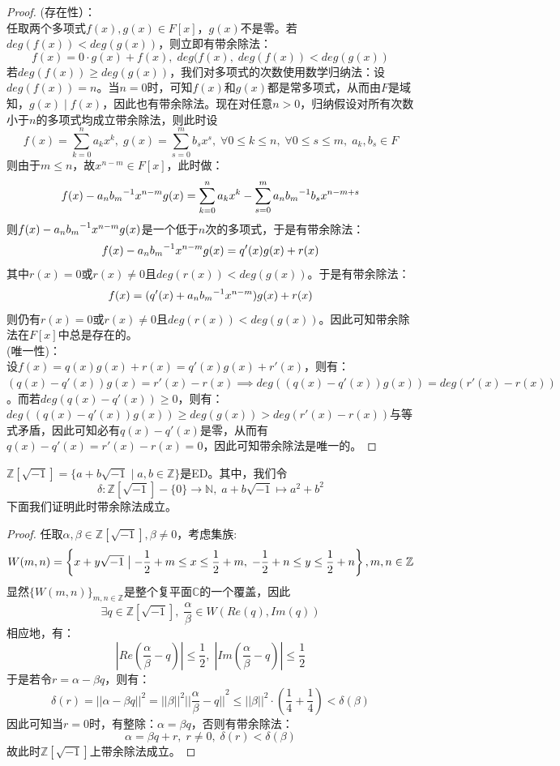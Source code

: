 \begin{proof}
(存在性）：\\
\indent 任取两个多项式$f(x),g(x)\in F[x]$，$g(x)$不是零。若$deg(f(x))<deg(g(x))$，则立即有带余除法：
\[
f(x)=0\cdot g(x)+f(x),\; deg(f(x),\; deg(f(x))<deg(g(x))
\]
\indent 若$deg(f(x))\geq deg(g(x))$，我们对多项式的次数使用数学归纳法：设$deg(f(x))=n$。当$n=0$时，可知$f(x)$和$g(x)$都是常多项式，从而由$F$是域知，$g(x)\mid f(x)$，因此也有带余除法。现在对任意$n>0$，归纳假设对所有次数小于$n$的多项式均成立带余除法，则此时设
\[
f(x)=\sum_{k=0}^{n}a_kx^k,\; g(x)=\sum_{s=0}^{m}b_sx^s,\;\forall 0\leq k\leq n,\;\forall 0\leq s\leq m,\; a_k,b_s\in F
\]
则由于$m\leq n$，故$x^{n-m}\in F[x]$，此时做：
\[
f(x)-a_n{b_m}^{-1}x^{n-m}g(x)=\sum_{k=0}^{n}a_kx^k-\sum_{s=0}^{m}a_n{b_m}^{-1}b_sx^{n-m+s}
\]
则$f(x)-a_n{b_m}^{-1}x^{n-m}g(x)$是一个低于$n$次的多项式，于是有带余除法：
\[
f(x)-a_n{b_m}^{-1}x^{n-m}g(x)=q'(x)g(x)+r(x)
\]
其中$r(x)=0$或$r(x)\neq 0$且$deg(r(x))<deg(g(x))$。于是有带余除法：
\[
f(x)=(q'(x)+a_n{b_m}^{-1}x^{n-m})g(x)+r(x)
\]
则仍有$r(x)=0$或$r(x)\neq 0$且$deg(r(x))<deg(g(x))$。因此可知带余除法在$F[x]$中总是存在的。\\
(唯一性)：\\
\indent 设$f(x)=q(x)g(x)+r(x)=q'(x)g(x)+r'(x)$，则有：$(q(x)-q'(x))g(x)=r'(x)-r(x)\implies deg((q(x)-q'(x))g(x))=deg(r'(x)-r(x))$。而若$deg(q(x)-q'(x))\geq 0$，则有：$deg((q(x)-q'(x))g(x))\geq deg(g(x))>deg(r'(x)-r(x))$与等式矛盾，因此可知必有$q(x)-q'(x)$是零，从而有$q(x)-q'(x)=r'(x)-r(x)=0$，因此可知带余除法是唯一的。
\end{proof}
$\mathbb{Z}[\sqrt{-1}]=\{a+b\sqrt{-1}\mid a,b\in \mathbb{Z}\}$是ED。其中，我们令
\[
\delta\colon \mathbb{Z}[\sqrt{-1}]-\{0\}\to \mathbb{N},\; a+b\sqrt{-1}\mapsto a^2+b^2
\]
下面我们证明此时带余除法成立。
\begin{proof}
任取$\alpha,\beta\in \mathbb{Z}[\sqrt{-1}],\beta\neq 0$，考虑集族:
\[
W(m,n)=\left\{x+y\sqrt{-1}\bigm|-\frac{1}{2}+m\leq x\leq\frac{1}{2}+m,\; -\frac{1}{2}+n\leq y\leq \frac{1}{2}+n\right\}, m,n\in \mathbb{Z}
\]
显然$\{W(m,n)\}_{m,n\in\mathbb{Z}}$是整个复平面$\mathbb{C}$的一个覆盖，因此
\[
\exists q\in \mathbb{Z}[\sqrt{-1}],\; \dfrac{\alpha}{\beta}\in W(Re(q),Im(q))
\]
相应地，有：
\[
|Re(\frac{\alpha}{\beta}-q)|\leq \frac{1}{2},\; |Im(\frac{\alpha}{\beta}-q)|\leq\frac{1}{2}
\]
于是若令$r=\alpha-\beta q$，则有：
\[
\delta(r)={||\alpha-\beta q||}^2={||\beta||}^2{||\frac{\alpha}{\beta}-q||}^2\leq{||\beta||}^2\cdot(\frac{1}{4}+\frac{1}{4})<\delta(\beta)
\]
因此可知当$r=0$时，有整除：$\alpha=\beta q$，否则有带余除法：
\[
\alpha=\beta q+r,\; r\neq 0,\; \delta(r)<\delta(\beta)
\]
故此时$\mathbb{Z}[\sqrt{-1}]$上带余除法成立。
\end{proof}
